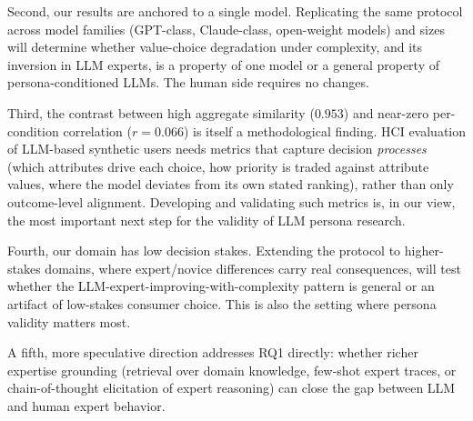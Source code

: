 \documentclass{sigchi-ext}
\begin{document}
Second, our results are anchored to a single model. Replicating the same protocol across model families (GPT-class, Claude-class, open-weight models) and sizes will determine whether value-choice degradation under complexity, and its inversion in LLM experts, is a property of one model or a general property of persona-conditioned LLMs. The human side requires no changes.

Third, the contrast between high aggregate similarity ($0.953$) and near-zero per-condition correlation ($r = 0.066$) is itself a methodological finding. HCI evaluation of LLM-based synthetic users needs metrics that capture decision \emph{processes} (which attributes drive each choice, how priority is traded against attribute values, where the model deviates from its own stated ranking), rather than only outcome-level alignment. Developing and validating such metrics is, in our view, the most important next step for the validity of LLM persona research.

Fourth, our domain has low decision stakes. Extending the protocol to higher-stakes domains, where expert/novice differences carry real consequences, will test whether the LLM-expert-improving-with-complexity pattern is general or an artifact of low-stakes consumer choice. This is also the setting where persona validity matters most.

A fifth, more speculative direction addresses RQ1 directly: whether richer expertise grounding (retrieval over domain knowledge, few-shot expert traces, or chain-of-thought elicitation of expert reasoning) can close the gap between LLM and human expert behavior.

\balance{}



\end{document}
